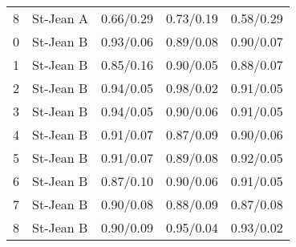\begin{table}
\begin{tabular}{l l c c c}
    8 & St-Jean A & 0.66/0.29 & 0.73/0.19 & 0.58/0.29 \\
    0 & St-Jean B & 0.93/0.06 & 0.89/0.08 & 0.90/0.07 \\
    1 & St-Jean B & 0.85/0.16 & 0.90/0.05 & 0.88/0.07 \\
    2 & St-Jean B & 0.94/0.05 & 0.98/0.02 & 0.91/0.05 \\
    3 & St-Jean B & 0.94/0.05 & 0.90/0.06 & 0.91/0.05 \\
    4 & St-Jean B & 0.91/0.07 & 0.87/0.09 & 0.90/0.06 \\
    5 & St-Jean B & 0.91/0.07 & 0.89/0.08 & 0.92/0.05 \\
    6 & St-Jean B & 0.87/0.10 & 0.90/0.06 & 0.91/0.05 \\
    7 & St-Jean B & 0.90/0.08 & 0.88/0.09 & 0.87/0.08 \\
    8 & St-Jean B & 0.90/0.09 & 0.95/0.04 & 0.93/0.02 \\
    \bottomrule
  \end{tabular}
\end{table}


